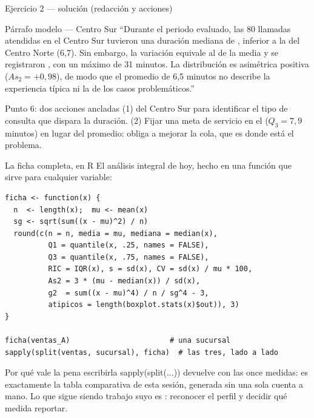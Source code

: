 \documentclass[aspectratio=169,10pt]{beamer}
\newcommand{\fx}[1]{{\ttfamily\color{uniAzul}#1}}
\begin{document}
\begin{frame}{Ejercicio 2 — solución (redacción y acciones)}
  \begin{exampleblock}{Párrafo modelo — Centro Sur}
    \scriptsize
    ``Durante el periodo evaluado, las 80 llamadas atendidas en el Centro Sur
    tuvieron una duración mediana de , inferior a la del
    Centro Norte (6,7). Sin embargo, la variación equivale al 
    de la media y se registraron , con un máximo
    de 31 minutos. La distribución es asimétrica positiva
    ($As_2 = +0{,}98$), de modo que el promedio de 6,5 minutos no describe la
    experiencia típica ni la de los casos problemáticos.''
  \end{exampleblock}

  \vspace{0.1cm}
  \begin{alertblock}{Punto 6: dos acciones ancladas}
    \scriptsize
    (1)  del Centro Sur para
    identificar el tipo de consulta que dispara la duración. \quad
    (2) Fijar una meta de servicio en el  ($Q_3 = 7{,}9$
    minutos) en lugar del promedio: obliga a mejorar la cola, que es donde
    está el problema.
  \end{alertblock}
\end{frame}

\begin{frame}[fragile]{La ficha completa, en R}
  \scriptsize
  El análisis integral de hoy, hecho en una función que sirve para cualquier
  variable:
\begin{lstlisting}[style=Rmini]
ficha <- function(x) {
  n  <- length(x);  mu <- mean(x)
  sg <- sqrt(sum((x - mu)^2) / n)
  round(c(n = n, media = mu, mediana = median(x),
          Q1 = quantile(x, .25, names = FALSE),
          Q3 = quantile(x, .75, names = FALSE),
          RIC = IQR(x), s = sd(x), CV = sd(x) / mu * 100,
          As2 = 3 * (mu - median(x)) / sd(x),
          g2  = sum((x - mu)^4) / n / sg^4 - 3,
          atipicos = length(boxplot.stats(x)$out)), 3)
}

ficha(ventas_A)                       # una sucursal
sapply(split(ventas, sucursal), ficha)  # las tres, lado a lado
\end{lstlisting}

  \vspace{-0.1cm}
  \begin{alertblock}{Por qué vale la pena escribirla}
    \tiny
    \fx{sapply(split(...))} devuelve  con las
    once medidas: es exactamente la tabla comparativa de esta sesión, generada
    sin una sola cuenta a mano. Lo que sigue siendo trabajo suyo es
    : reconocer el perfil y decidir qué medida reportar.
  \end{alertblock}
\end{frame}
\end{document}
